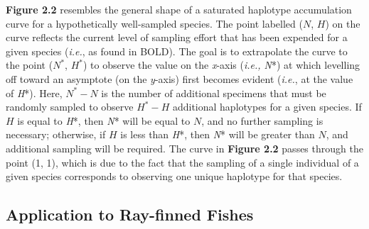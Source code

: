 \noindent \textbf{Figure 2.2} resembles the general shape of a saturated haplotype accumulation curve for a hypothetically well-sampled species. The point labelled ($N$, $H$) on the curve reflects the current level of sampling effort that has been expended for a given species (\textit{i.e.}, as found in BOLD). The goal is to extrapolate the curve to the point ($N^*$, $H^*$) to observe the value on the \textit{x}-axis (\textit{i.e., N}*) at which levelling off toward an asymptote (on the \textit{y}-axis) first becomes evident (\textit{i.e.}, at the value of \textit{H}*). Here, $N^*-N$ is the number of additional specimens that must be randomly sampled to observe $H^*-H$ additional haplotypes for a given species. If $H$ is equal to \textit{H}*, then \textit{N}* will be equal to $N$, and no further sampling is necessary; otherwise, if $H$ is less than \textit{H}*, then \textit{N}* will be greater than $N$, and additional sampling will be required.  The curve in \textbf{Figure 2.2} passes through the point (1, 1), which is due to the fact that the sampling of a single individual of a given species corresponds to observing one unique haplotype for that species.



\subsection{Application to Ray-finned Fishes}


